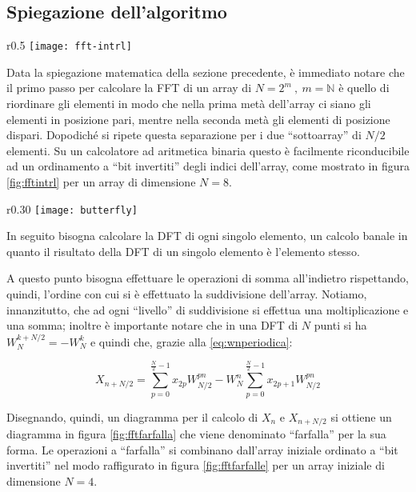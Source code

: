 \subsection{Spiegazione dell'algoritmo}

\begin{wrapfigure}{r}{0.5\textwidth}
    \centering
    \texttt{[image: fft-intrl]}
    \caption{Scomposizione interlacciata per il calcolo della FFT di un array di 8 elementi.}
    \label{fig:fftintrl}
\end{wrapfigure}

Data la spiegazione matematica della sezione precedente, è immediato notare che il primo passo per calcolare la FFT di un array di $N=2^m\ ,\ m=\mathbb{N}$ è quello di riordinare gli elementi in modo che nella prima metà dell'array ci siano gli elementi in posizione pari, mentre nella seconda metà gli elementi di posizione dispari. Dopodiché si ripete questa separazione per i due ``sottoarray'' di $N/2$ elementi. Su un calcolatore ad aritmetica binaria questo è facilmente riconducibile ad un ordinamento a ``bit invertiti'' degli indici dell'array, come mostrato in figura \ref{fig:fftintrl} per un array di dimensione $N=8$.

\begin{wrapfigure}{r}{0.30\textwidth}
    \centering
    \texttt{[image: butterfly]}
    \caption{La ``farfalla'' formata dalle operazioni per il calcolo della FFT.}
    \label{fig:fftfarfalla}
\end{wrapfigure}

In seguito bisogna calcolare la DFT di ogni singolo elemento, un calcolo banale in quanto il risultato della DFT di un singolo elemento è l'elemento stesso.

A questo punto bisogna effettuare le operazioni di somma all'indietro rispettando, quindi, l'ordine con cui si è effettuato la suddivisione dell'array. Notiamo, innanzitutto, che ad ogni ``livello'' di suddivisione si effettua una moltiplicazione e una somma; inoltre è importante notare che in una DFT di $N$ punti si ha $W_N^{k+N/2} = -W_N^k$ e quindi che, grazie alla \ref{eq:wnperiodica}:

\begin{equation}
    X_{n+N/2} = \displaystyle\sum_{p=0}^{\frac{N}{2}-1}x_{2p} W_{N/2}^{pn} - W_N^{n}\displaystyle\sum_{p=0}^{\frac{N}{2}-1}x_{2p+1} W_{N/2}^{pn}
    \label{eq:dftnsu2}
\end{equation}

Disegnando, quindi, un diagramma per il calcolo di $X_n$ e $X_{n+N/2}$ si ottiene un diagramma in figura \ref{fig:fftfarfalla} che viene denominato ``farfalla'' per la sua forma. Le operazioni a ``farfalla'' si combinano dall'array iniziale ordinato a ``bit invertiti'' nel modo raffigurato in figura \ref{fig:fftfarfalle} per un array iniziale di dimensione $N=4$.

